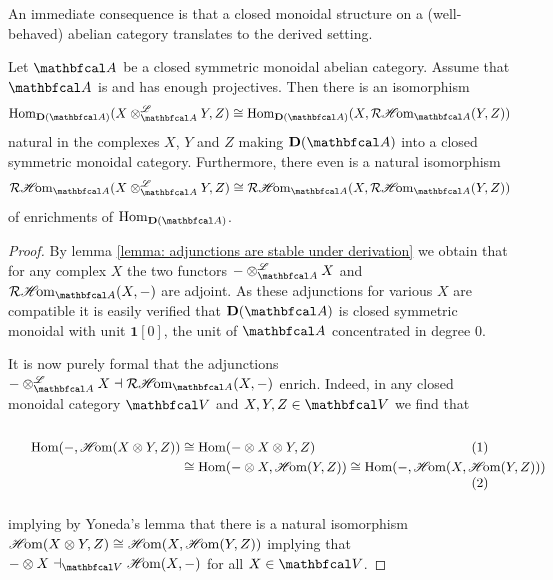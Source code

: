 An immediate consequence is that a closed monoidal structure on a (well-behaved) abelian category translates to the derived setting.
\begin{lemma}
	\label{lemma: deriving a closed monoidal structure}
	
	Let $\category{A}$ be a closed symmetric monoidal abelian category. Assume that $\category{A}$ is  and has enough projectives. Then there is an isomorphism
		$$\Hom_\derived{\category{A}}(X\Dotimes_\category{A}Y, Z)\cong \Hom_\derived{\category{A}}(X, \intRHom_\category{A}(Y, Z))$$
	natural in the complexes $X$, $Y$ and $Z$ making $\derived{\category{A}}$ into a closed symmetric monoidal category. Furthermore, there even is a natural isomorphism
		$$\intRHom_\category{A}(X\Dotimes_\category{A}Y, Z)\cong \intRHom_\category{A}(X, \intRHom_\category{A}(Y, Z))$$
	of enrichments of $\Hom_\derived{\category{A}}$.
\end{lemma}
\begin{proof}
	By lemma \ref{lemma: adjunctions are stable under derivation} we obtain that for any complex $X$ the two functors $- \Dotimes_\category{A} X$ and $\intRHom_\category{A}(X, -)$ are adjoint. As these adjunctions for various $X$ are compatible it is easily verified that $\derived{\category{A}}$ is closed symmetric monoidal with unit $\mathbf{1}[0]$, the unit of $\category{A}$ concentrated in degree $0$.
	
	It is now purely formal that the adjunctions $-\Dotimes_\category{A}X\ladj \intRHom_\category{A}(X, -)$ enrich. Indeed, in any closed monoidal category $\category{V}$ and $X, Y, Z\in \category{V}$ we find that
	\begin{equation}
		\scalebox{0.95}{\parbox{\textwidth}{
			\begin{align*}
				\Hom(-, \intHom(X\otimes Y, Z))&\cong \Hom(-\otimes X\otimes Y, Z)\\
				&\cong \Hom(-\otimes X, \intHom(Y, Z))\cong \Hom(-, \intHom(X, \intHom(Y, Z)))
			\end{align*}
		}}
	\end{equation}
	implying by Yoneda's lemma that there is a natural isomorphism ${\operatorname{\mathscr{H}\!om}}(X\otimes Y, Z)\cong {\operatorname{\mathscr{H}\!om}}(X,{\operatorname{\mathscr{H}\!om}}(Y, Z))$ implying that $-\otimes X\ladj_\category{V} \intHom(X, -)$ for all $X \in \category{V}$.
\end{proof}

